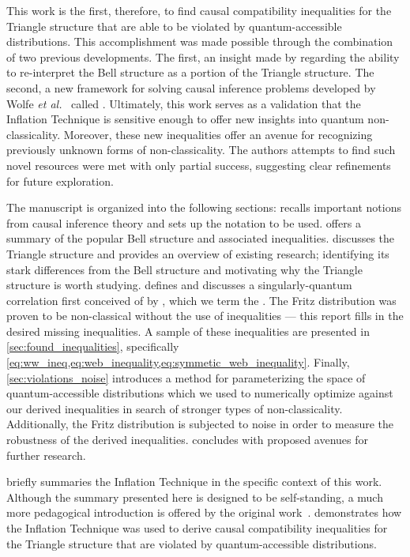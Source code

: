 \documentclass[aps, 10pt, english, twoside, pra, nofootinbib, tightenlines, longbibliography, superscriptaddress]{revtex4-1}
\begin{document}
    This work is the first, therefore, to find causal compatibility inequalities for the Triangle structure that are able to be violated by quantum-accessible distributions. This accomplishment was made possible through the combination of two previous developments. The first, an insight made by \citet{Fritz_2012} regarding the ability to re-interpret the Bell structure as a portion of the Triangle structure. The second, a new framework for solving causal inference problems developed by Wolfe \emph{et al.}~\cite{Inflation} called . Ultimately, this work serves as a validation that the Inflation Technique is sensitive enough to offer new insights into quantum non-classicality. Moreover, these new inequalities offer an avenue for recognizing previously unknown forms of non-classicality. The authors attempts to find such novel resources were met with only partial success, suggesting clear refinements for future exploration.

    The manuscript is organized into the following sections:  recalls important notions from causal inference theory and sets up the notation to be used.  offers a summary of the popular Bell structure and associated inequalities.  discusses the Triangle structure and provides an overview of existing research; identifying its stark differences from the Bell structure and motivating why the Triangle structure is worth studying.  defines and discusses a singularly-quantum correlation first conceived of by \citet{Fritz_2012}, which we term the . The Fritz distribution was proven to be non-classical without the use of inequalities --- this report fills in the desired missing inequalities. A sample of these inequalities are presented in \cref{sec:found_inequalities}, specifically \cref{eq:ww_ineq,eq:web_inequality,eq:symmetic_web_inequality}. Finally, \cref{sec:violations_noise} introduces a method for parameterizing the space of quantum-accessible distributions which we used to numerically optimize against our derived inequalities in search of stronger types of non-classicality. Additionally, the Fritz distribution is subjected to noise in order to measure the robustness of the derived inequalities.  concludes with proposed avenues for further research.

     briefly summaries the Inflation Technique in the specific context of this work. Although the summary presented here is designed to be self-standing, a much more pedagogical introduction is offered by the original work~\cite{Inflation}.  demonstrates how the Inflation Technique was used to derive causal compatibility inequalities for the Triangle structure that are violated by quantum-accessible distributions.
\end{document}
